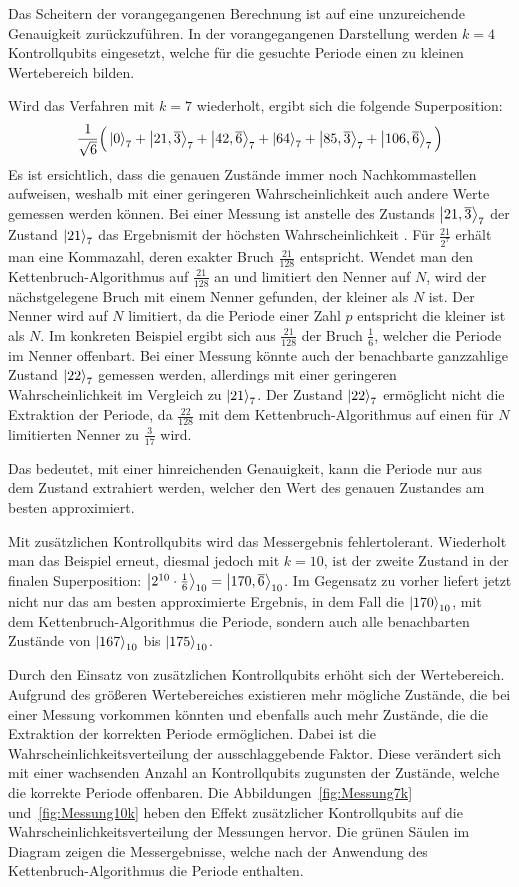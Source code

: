 Das Scheitern der vorangegangenen Berechnung ist auf eine unzureichende Genauigkeit zurückzuführen. 
In der vorangegangenen Darstellung werden \(k=4\) Kontrollqubits eingesetzt, 
welche für die gesuchte Periode einen zu kleinen Wertebereich bilden.

Wird das Verfahren mit \(k=7\) wiederholt, ergibt sich die folgende Superposition:
\[\frac{1}{\sqrt{6}}
\Big(\ket{0}_7 +\ket{21,\overline{3}}_7 + \ket{42,\overline{6}}_7+
\ket{64}_7+\ket{85,\overline{3}}_7 + \ket{106,\overline{6}}_7
\Big) \]
Es ist ersichtlich, dass die genauen Zustände immer noch Nachkommastellen aufweisen, 
weshalb mit einer geringeren Wahrscheinlichkeit auch andere Werte gemessen werden können.
Bei einer Messung ist anstelle des Zustands \(\ket{21,\overline{3}}_7\) der Zustand \(\ket{21}_7\) das Ergebnismit der höchsten Wahrscheinlichkeit .
Für \(\frac{21}{2^{7}}\) erhält man eine Kommazahl, deren exakter Bruch \(\frac{21}{128}\) entspricht.
Wendet man den Kettenbruch-Algorithmus auf \(\frac{21}{128}\) an und limitiert den Nenner auf \(N\), 
wird der nächstgelegene Bruch mit einem Nenner gefunden, der kleiner als \(N\) ist.
Der Nenner wird auf \(N\) limitiert, da die Periode einer Zahl \(p\) entspricht die kleiner ist als \(N\).
Im konkreten Beispiel ergibt sich aus \(\frac{21}{128}\) der Bruch \(\frac{1}{6}\), 
welcher die Periode im Nenner offenbart.
Bei einer Messung könnte auch der benachbarte ganzzahlige Zustand \(\ket{22}_7\) gemessen werden, 
allerdings mit einer geringeren Wahrscheinlichkeit im Vergleich zu \(\ket{21}_7\).
Der Zustand \(\ket{22}_7\) ermöglicht nicht die Extraktion der Periode, 
da \(\frac{22}{128}\) mit dem Kettenbruch-Algorithmus auf einen für \(N\) limitierten Nenner
zu \(\frac{3}{17}\) wird.

Das bedeutet, 
mit einer hinreichenden Genauigkeit, kann die Periode nur aus dem Zustand extrahiert werden, 
welcher den Wert des genauen Zustandes am besten approximiert.

Mit zusätzlichen Kontrollqubits wird das Messergebnis fehlertolerant.
Wiederholt man das Beispiel erneut, diesmal jedoch mit \(k=10\), 
ist der zweite Zustand in der finalen Superposition: 
\(\ket{2^{10} \cdot \frac{1}{6}}_{10} =\ket{170,\overline{6}}_{10}\).
Im Gegensatz zu vorher liefert jetzt nicht nur das am besten approximierte Ergebnis, 
in dem Fall die \(\ket{170}_{10}\), mit dem Kettenbruch-Algorithmus die Periode, 
sondern auch alle benachbarten Zustände von \(\ket{167}_{10}\) bis \(\ket{175}_{10}\).

Durch den Einsatz von zusätzlichen Kontrollqubits erhöht sich der Wertebereich. 
Aufgrund des größeren Wertebereiches existieren mehr mögliche Zustände, 
die bei einer Messung vorkommen könnten und ebenfalls auch mehr Zustände, 
die die Extraktion der korrekten Periode ermöglichen. 
Dabei ist die Wahrscheinlichkeitsverteilung der ausschlaggebende Faktor. 
Diese verändert sich mit einer wachsenden Anzahl an Kontrollqubits zugunsten der Zustände, 
welche die korrekte Periode offenbaren.
Die Abbildungen~\ref{fig:Messung7k} und~\ref{fig:Messung10k} 
heben den Effekt zusätzlicher Kontrollqubits auf die Wahrscheinlichkeitsverteilung der Messungen hervor.
Die grünen Säulen im Diagram zeigen die Messergebnisse, 
welche nach der Anwendung des Kettenbruch-Algorithmus die Periode enthalten.

